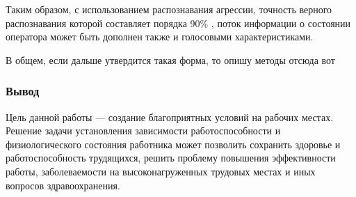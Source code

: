 Таким образом, с использованием распознавания агрессии, точность верного распознавания которой составляет порядка 90\% \cite{recoginitionOfPsycho}, поток информации о состоянии оператора может быть дополнен также и голосовыми характеристиками.

В общем, если дальше утвердится такая форма, то опишу методы отсюда вот\cite{voiceMethod}

\subsubsection*{Вывод}
Цель данной работы --- создание благоприятных условий на рабочих местах. Решение задачи установления зависимости работоспособности и физиологического состояния работника может позволить сохранить здоровье и работоспособность трудящихся, решить проблему повышения эффективности работы, заболеваемости на высоконагруженных трудовых местах и иных вопросов здравоохранения.


\pagebreak